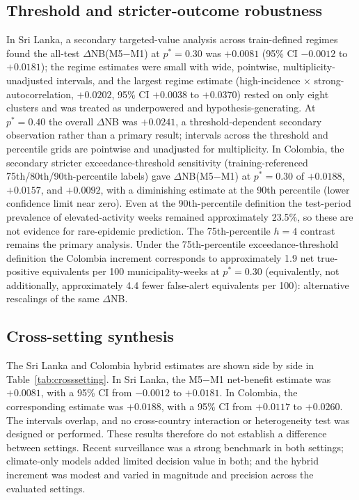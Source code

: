 \documentclass[11pt,a4paper]{article}
\begin{document}
\subsection{Threshold and stricter-outcome robustness}
In Sri Lanka, a secondary targeted-value analysis across train-defined regimes found the all-test $\Delta$NB(M5$-$M1) at $p^*=0.30$ was $+0.0081$ (95\% CI $-0.0012$ to $+0.0181$); the regime estimates were small with wide, pointwise, multiplicity-unadjusted intervals, and the largest regime estimate (high-incidence $\times$ strong-autocorrelation, $+0.0202$, 95\% CI $+0.0038$ to $+0.0370$) rested on only eight clusters and was treated as underpowered and hypothesis-generating. At $p^*=0.40$ the overall $\Delta$NB was $+0.0241$, a threshold-dependent secondary observation rather than a primary result; intervals across the threshold and percentile grids are pointwise and unadjusted for multiplicity. In Colombia, the secondary stricter exceedance-threshold sensitivity (training-referenced 75th/80th/90th-percentile labels) gave $\Delta$NB(M5$-$M1) at $p^*=0.30$ of $+0.0188$, $+0.0157$, and $+0.0092$, with a diminishing estimate at the 90th percentile (lower confidence limit near zero). Even at the 90th-percentile definition the test-period prevalence of elevated-activity weeks remained approximately 23.5\%, so these are not evidence for rare-epidemic prediction. The 75th-percentile $h=4$ contrast remains the primary analysis. Under the 75th-percentile exceedance-threshold definition the Colombia increment corresponds to approximately 1.9 net true-positive equivalents per 100 municipality-weeks at $p^*=0.30$ (equivalently, not additionally, approximately 4.4 fewer false-alert equivalents per 100): alternative rescalings of the same $\Delta$NB.

\subsection{Cross-setting synthesis}
The Sri Lanka and Colombia hybrid estimates are shown side by side in Table~\ref{tab:crosssetting}. In Sri Lanka, the M5$-$M1 net-benefit estimate was $+0.0081$, with a 95\% CI from $-0.0012$ to $+0.0181$. In Colombia, the corresponding estimate was $+0.0188$, with a 95\% CI from $+0.0117$ to $+0.0260$. The intervals overlap, and no cross-country interaction or heterogeneity test was designed or performed. These results therefore do not establish a difference between settings. Recent surveillance was a strong benchmark in both settings; climate-only models added limited decision value in both; and the hybrid increment was modest and varied in magnitude and precision across the evaluated settings.
\end{document}
